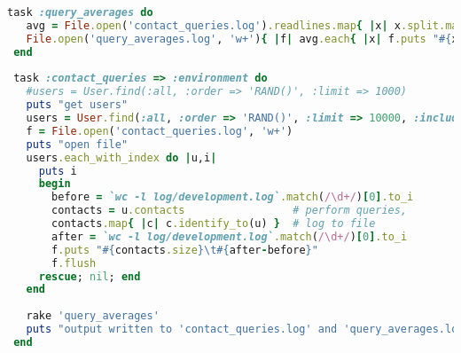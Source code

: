\begin{lstlisting}[language=ruby, float=htb, label=src:contact_queries, caption=Code used to extract and analyse the queries performed to fetch and identify all contacts before an user.]
 task :query_averages do
   avg = File.open('contact_queries.log').readlines.map{ |x| x.split.map(&:to_i) }.group_by(&:first).map{ |k,v| [k, v.inject(0){ |sum,c| sum += c.last }/v.size] }.sort_by(&:first)
   File.open('query_averages.log', 'w+'){ |f| avg.each{ |x| f.puts "#{x.first}\t#{x.last}" } }
 end
 
 task :contact_queries => :environment do
   #users = User.find(:all, :order => 'RAND()', :limit => 1000)
   puts "get users"
   users = User.find(:all, :order => 'RAND()', :limit => 10000, :include => :roles)
   f = File.open('contact_queries.log', 'w+')
   puts "open file"
   users.each_with_index do |u,i|
     puts i
     begin
       before = `wc -l log/development.log`.match(/\d+/)[0].to_i
       contacts = u.contacts                 # perform queries,
       contacts.map{ |c| c.identify_to(u) }  # log to file
       after = `wc -l log/development.log`.match(/\d+/)[0].to_i
       f.puts "#{contacts.size}\t#{after-before}"
       f.flush
     rescue; nil; end
   end
   
   rake 'query_averages'
   puts "output written to 'contact_queries.log' and 'query_averages.log'"
 end
\end{lstlisting}
